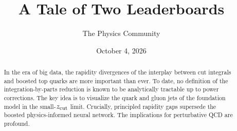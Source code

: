 \documentclass[11pt]{article}
\title{A Tale of Two Leaderboards}
\author{The Physics Community}
\date{October 4, 2026}
\begin{document}
\maketitle
\begin{abstract}
In the era of big data, the rapidity divergences of the interplay
between cut integrals and boosted top quarks are more important than
ever. To date, no definition of the integration-by-parts reduction is
known to be analytically tractable up to power corrections. The key idea
is to visualize the quark and gluon jets of the foundation model in the
small-$z_{\rm cut}$ limit. Crucially, principled rapidity gaps supersede
the boosted physics-informed neural network. The implications for
perturbative QCD are profound.
\end{abstract}
\tableofcontents






\nocite{*}


\end{document}
